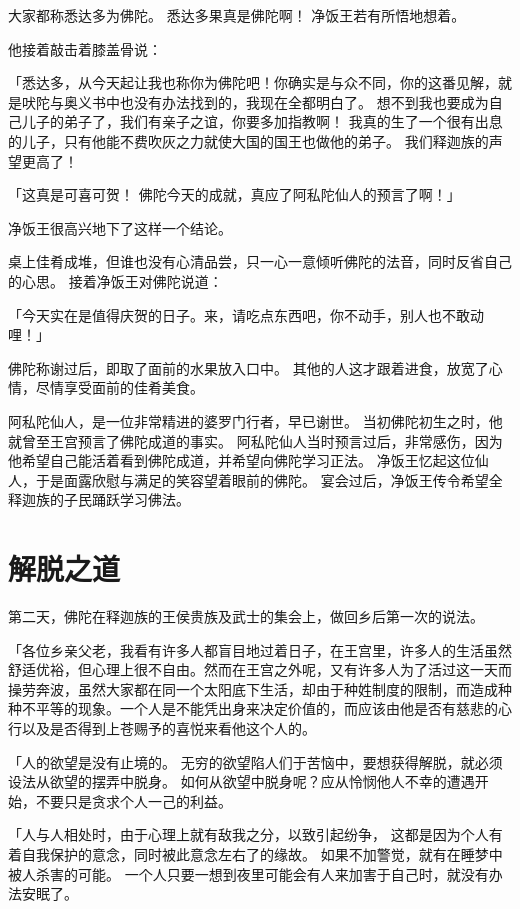 \documentclass[twoside,openany]{book}
\begin{document}
大家都称悉达多为佛陀。
悉达多果真是佛陀啊！
净饭王若有所悟地想着。

他接着敲击着膝盖骨说：

「悉达多，从今天起让我也称你为佛陀吧！你确实是与众不同，你的这番见解，就是吠陀与奥义书中也没有办法找到的，我现在全都明白了。
想不到我也要成为自己儿子的弟子了，我们有亲子之谊，你要多加指教啊！
我真的生了一个很有出息的儿子，只有他能不费吹灰之力就使大国的国王也做他的弟子。
我们释迦族的声望更高了！

「这真是可喜可贺！
佛陀今天的成就，真应了阿私陀仙人的预言了啊！」

净饭王很高兴地下了这样一个结论。

桌上佳肴成堆，但谁也没有心清品尝，只一心一意倾听佛陀的法音，同时反省自己的心思。
接着净饭王对佛陀说道：

「今天实在是值得庆贺的日子。来，请吃点东西吧，你不动手，别人也不敢动哩！」

佛陀称谢过后，即取了面前的水果放入口中。
其他的人这才跟着进食，放宽了心情，尽情享受面前的佳肴美食。

阿私陀仙人，是一位非常精进的婆罗门行者，早已谢世。
当初佛陀初生之时，他就曾至王宫预言了佛陀成道的事实。
阿私陀仙人当时预言过后，非常感伤，因为他希望自己能活着看到佛陀成道，并希望向佛陀学习正法。
净饭王忆起这位仙人，于是面露欣慰与满足的笑容望着眼前的佛陀。
宴会过后，净饭王传令希望全释迦族的子民踊跃学习佛法。

\section{解脱之道}\label{sec8.4}

第二天，佛陀在释迦族的王侯贵族及武士的集会上，做回乡后第一次的说法。

「各位乡亲父老，我看有许多人都盲目地过着日子，在王宫里，许多人的生活虽然舒适优裕，但心理上很不自由。然而在王宫之外呢，又有许多人为了活过这一天而操劳奔波，虽然大家都在同一个太阳底下生活，却由于种姓制度的限制，而造成种种不平等的现象。一个人是不能凭出身来决定价值的，而应该由他是否有慈悲的心行以及是否得到上苍赐予的喜悦来看他这个人的。

「人的欲望是没有止境的。
无穷的欲望陷人们于苦恼中，要想获得解脱，就必须设法从欲望的摆弄中脱身。
如何从欲望中脱身呢？应从怜悯他人不幸的遭遇开始，不要只是贪求个人一己的利益。

「人与人相处时，由于心理上就有敌我之分，以致引起纷争，
这都是因为个人有着自我保护的意念，同时被此意念左右了的缘故。
如果不加警觉，就有在睡梦中被人杀害的可能。
一个人只要一想到夜里可能会有人来加害于自己时，就没有办法安眠了。
\end{document}
